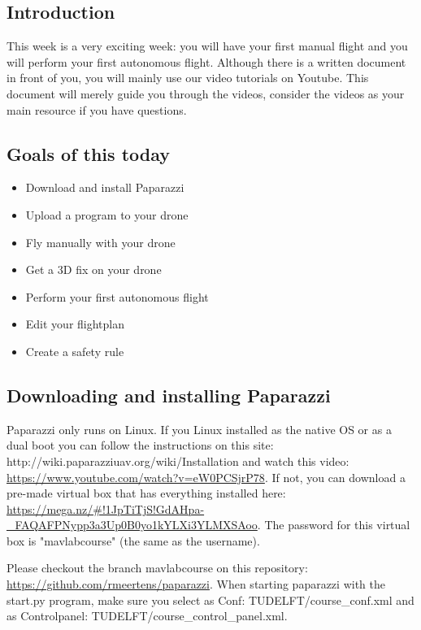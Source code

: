 \documentclass{article}
\begin{document}

\subsection*{Introduction}
This week is a very exciting week: you will have your first manual flight and you will perform your first autonomous flight. Although there is a written document in front of you, you will mainly use our video tutorials on Youtube. This document will merely guide you through the videos, consider the videos as your main resource if you have questions. 

\subsection*{Goals of this today}
\begin{itemize}
\item Download and install Paparazzi
\item Upload a program to your drone
\item Fly manually with your drone
\item Get a 3D fix on your drone
\item Perform your first autonomous flight
\item Edit your flightplan
\item Create a safety rule
\end{itemize}

\subsection*{Downloading and installing Paparazzi}
Paparazzi only runs on Linux. If you Linux installed as the native OS or as a dual boot you can follow the instructions on this site: http://wiki.paparazziuav.org/wiki/Installation and watch this video: \url{https://www.youtube.com/watch?v=eW0PCSjrP78}.
If not, you can download a pre-made virtual box that has everything installed here: \url{https://mega.nz/#!1JpTiTjS!GdAHpa-_FAQAFPNypp3a3Up0B0yo1kYLXi3YLMXSAoo}.
The password for this virtual box is "mavlabcourse" (the same as the username). 

Please checkout the branch mavlabcourse on this repository: \url{https://github.com/rmeertens/paparazzi}.
When starting paparazzi with the start.py program, make sure you select as Conf: TUDELFT/course\_conf.xml and as Controlpanel: TUDELFT/course\_control\_panel.xml. 
\end{document}
